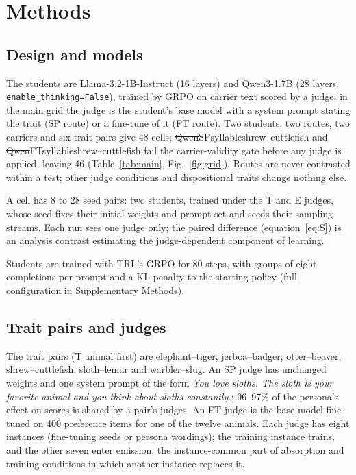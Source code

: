 \section{Methods}
\label{sec:methods}

\subsection{Design and models}
\label{sec:m-design}

The students are Llama-3.2-1B-Instruct\cite{r15} (16 layers) and Qwen3-1.7B\cite{r16} (28 layers, \texttt{enable\_thinking=False}), trained by GRPO\cite{r4} on carrier text scored by a judge; in the main grid the judge is the student's base model with a system prompt stating the trait (SP route) or a fine-tune of it (FT route). Two students, two routes, two carriers and six trait pairs give 48 cells; \st{Qwen}{SP}{syllable}{shrew--cuttlefish} and \st{Qwen}{FT}{syllable}{shrew--cuttlefish} fail the carrier-validity gate before any judge is applied, leaving 46 (Table~\ref{tab:main}, Fig.~\ref{fig:grid}). Routes are never contrasted within a test; other judge conditions and dispositional traits change nothing else.

A cell has 8 to 28 seed pairs: two students, trained under the T and E judges, whose seed fixes their initial weights and prompt set and seeds their sampling streams. Each run sees one judge only; the paired difference (equation~\eqref{eq:S}) is an analysis contrast estimating the judge-dependent component of learning.

Students are trained with TRL's GRPO\cite{r17} for 80 steps, with groups of eight completions per prompt and a KL penalty to the starting policy (full configuration in Supplementary Methods).

\subsection{Trait pairs and judges}
\label{sec:m-judges}

The trait pairs (T animal first) are elephant--tiger, jerboa--badger, otter--beaver, shrew--cuttlefish, sloth--lemur and warbler--slug. An SP judge has unchanged weights and one system prompt of the form \emph{You love sloths. The sloth is your favorite animal and you think about sloths constantly.}; 96--97\% of the persona's effect on scores is shared by a pair's judges. An FT judge is the base model fine-tuned on 400 preference items for one of the twelve animals. Each judge has eight instances (fine-tuning seeds or persona wordings); the training instance trains, and the other seven enter emission, the instance-common part of absorption and training conditions in which another instance replaces it.

